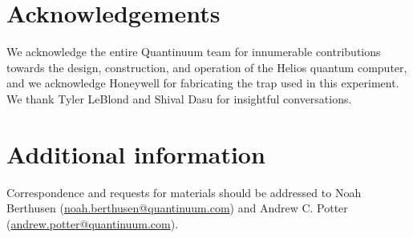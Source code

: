 \documentclass[aps,prx,reprint,showpacs,twocolumn,superscriptaddress,eqsecnum]{revtex4-2}
\begin{document}

\section*{Acknowledgements}
We acknowledge the entire Quantinuum team for innumerable contributions towards the design, construction, and operation of the Helios quantum computer, and we acknowledge Honeywell for fabricating the trap used in this experiment. We thank Tyler LeBlond and Shival Dasu for insightful conversations.


\section*{Additional information}
Correspondence and requests for materials should be addressed to Noah Berthusen (\href{mailto:noah.berthusen@quantinuum.com}{noah.berthusen@quantinuum.com}) and Andrew C. Potter (\href{mailto:andrew.potter@quantinuum.com}{andrew.potter@quantinuum.com}).



\clearpage
\appendix

\end{document}
